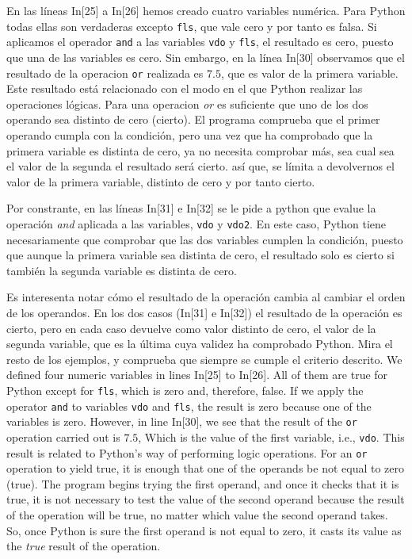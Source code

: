 \begin{paracol}{2}
En las líneas In[25] a In[26] hemos creado cuatro variables numérica. Para Python todas ellas son verdaderas excepto \texttt{fls}, que vale cero y por tanto es falsa. Si aplicamos el operador \texttt{and} a las variables \texttt{vdo} y \texttt{fls}, el resultado es cero, puesto que una de las variables es cero. Sin embargo, en la línea In[30] observamos que el resultado de la operacion \texttt{or} realizada es $7.5$, que es valor de la primera variable. Este resultado está relacionado con el modo en el que Python realizar las operaciones lógicas. Para una operacion \emph{or} es suficiente que uno de los dos operando sea distinto de cero (cierto). El programa comprueba que el primer operando cumpla con la condición, pero una vez que ha comprobado que la primera variable es distinta de cero, ya no necesita comprobar más, sea cual sea el valor de la segunda el resultado será cierto. así que, se límita a devolvernos el valor de la primera variable, distinto de cero y por tanto cierto.

Por constrante, en las líneas In[31] e In[32] se le pide a python que evalue la operación \emph{and} aplicada a las variables, \texttt{vdo} y \texttt{vdo2}. En este caso, Python tiene necesariamente que comprobar que las dos variables cumplen la condición, puesto que aunque la primera variable sea distinta de cero, el resultado solo es cierto si también la segunda variable es distinta de cero. 

Es interesenta notar cómo el resultado de la operación cambia al cambiar el orden de los operandos. En los dos casos (In[31] e In[32]) el resultado de la operación es cierto, pero en cada caso devuelve como valor distinto de cero, el valor de la segunda variable, que es la última cuya validez ha comprobado Python. Mira el resto de los ejemplos, y comprueba que siempre se cumple el criterio descrito.
\switchcolumn
We defined four numeric variables in lines In[25] to In[26]. All of them are true for Python except for \texttt{fls}, which is zero and, therefore, false. If we apply the operator \texttt{and} to variables \texttt{vdo} and \texttt{fls}, the result is zero because one of the variables is zero. However, in line In[30], we see that the result of the \texttt{or} operation carried out is $7.5$, Which is the value of the first variable, i.e., \texttt{vdo}. This result is related to Python's way of performing logic operations. For an  \texttt{or} operation to yield true, it is enough that one of the operands be not equal to zero (true). The program begins trying the first operand, and once it checks that it is true, it is not necessary to test the value of the second operand because the result of the operation will be true, no matter which value the second operand takes. So, once Python is sure the first operand is not equal to zero, it casts its value as the \emph{true} result of the operation.


\end{paracol}
